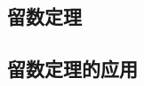 \subsection{留数定理}
\label{subsec:residual_theorem}


\subsection{留数定理的应用}
\label{subsec:residual_theorem_applications}